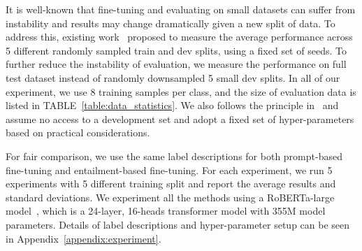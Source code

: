 \documentclass{article}
\begin{document}
It is well-known that fine-tuning and evaluating on small datasets can suffer from instability and results may change dramatically given a new split of data. To address this, existing work~\citep{gao2020making} proposed to measure the average performance across 5 different randomly sampled train and dev splits, using a fixed set of seeds. To further reduce the instability of evaluation, we measure the performance on full test dataset instead of randomly downsampled 5 small dev splits. In all of our experiment, we use 8 training samples per class, and the size of evaluation data is listed in TABLE~\ref{table:data_statistics}. We also follows the principle in~\citep{schick2020exploiting,schick2020s} and assume no access to a development set and adopt a fixed set of
hyper-parameters based on practical considerations.

For fair comparison, we use the same label descriptions for both prompt-based fine-tuning and entailment-based fine-tuning. For each experiment, we run 5 experiments with 5 different training split and report the average results and standard deviations. We experiment all the methods using a RoBERTa-large model~\citep{liu2019roberta}, which is a 24-layer, 16-heads transformer model with 355M model parameters. Details of label descriptions and hyper-parameter setup can be seen in Appendix~\ref{appendix:experiment}.
\end{document}

